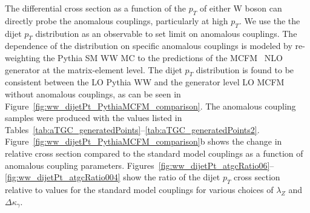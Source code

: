 %
The differential cross section as a function of the 
$p_T$ of either W boson can directly probe the anomalous couplings,
particularly at high $p_T$.
We use the the dijet $p_T$ distribution as an observable to set limit on 
anomalous couplings.
The dependence of the distribution on specific anomalous couplings 
is modeled by re-weighting the Pythia SM WW MC to the predictions 
of the MCFM~\cite{MCFM} NLO generator at the matrix-element level. 
The dijet $p_T$ distribution is found
to be consistent between the LO Pythia WW and the generator level LO 
MCFM without anomalous couplings, as can be seen in 
Figure~\ref{fig:ww_dijetPt_PythiaMCFM_comparison}. 
The anomalous coupling samples were produced with the values listed in 
Tables~\ref{tab:aTGC_generatedPoints}--\ref{tab:aTGC_generatedPoints2}.
Figure~\ref{fig:ww_dijetPt_PythiaMCFM_comparison}b shows the change in 
relative cross section compared to the standard model couplings 
as a function of anomalous coupling parameters.
Figures~\ref{fig:ww_dijetPt_atgcRatio06}--\ref{fig:ww_dijetPt_atgcRatio004} 
show the ratio of the dijet $p_T$ cross section relative to values for 
the standard model couplings for various choices of $\lambda_Z$ and 
$\Delta{\kappa_\gamma}$.
